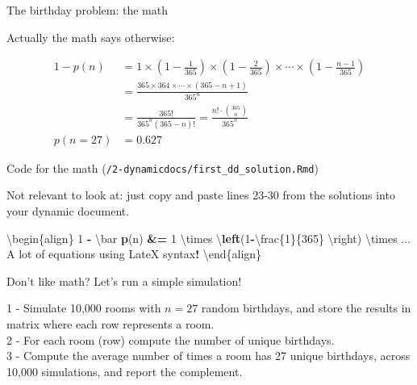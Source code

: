 \documentclass[ignorenonframetext,]{beamer}
\newenvironment{Shaded}{\begin{snugshade}}{\end{snugshade}}
\newcommand{\KeywordTok}[1]{\textcolor[rgb]{0.13,0.29,0.53}{\textbf{#1}}}
\newcommand{\DecValTok}[1]{\textcolor[rgb]{0.00,0.00,0.81}{#1}}
\newcommand{\StringTok}[1]{\textcolor[rgb]{0.31,0.60,0.02}{#1}}
\newcommand{\OperatorTok}[1]{\textcolor[rgb]{0.81,0.36,0.00}{\textbf{#1}}}
\newcommand{\ErrorTok}[1]{\textcolor[rgb]{0.64,0.00,0.00}{\textbf{#1}}}
\newcommand{\NormalTok}[1]{#1}
\begin{document}
\begin{frame}{The birthday problem: the math}

Actually the math says otherwise:

\begin{align} 
 1 -  p(n) &= 1 \times \left(1-\frac{1}{365}\right) \times \left(1-\frac{2}{365}\right) \times \cdots \times \left(1-\frac{n-1}{365}\right) \nonumber  \\  &= \frac{ 365 \times 364 \times \cdots \times (365-n+1) }{ 365^n } \nonumber \\ &= \frac{ 365! }{ 365^n (365-n)!} = \frac{n!\cdot\binom{365}{n}}{365^n}\\
p(n= 27) &= 0.627  \nonumber
\end{align}

\end{frame}

\begin{frame}[fragile]{Code for the math
(\texttt{/2-dynamicdocs/first\_dd\_solution.Rmd})}

Not relevant to look at: just copy and paste lines 23-30 from the
solutions into your dynamic document.

\begin{Shaded}
\begin{Highlighting}[]
\NormalTok{\textbackslash{}begin\{align\} }
 \DecValTok{1} \OperatorTok{-}\StringTok{ }\NormalTok{\textbackslash{}bar }\KeywordTok{p}\NormalTok{(n) }\OperatorTok{&}\ErrorTok{=}\StringTok{ }\DecValTok{1}\NormalTok{ \textbackslash{}times \textbackslash{}}\KeywordTok{left}\NormalTok{(}\DecValTok{1}\OperatorTok{-}\NormalTok{\textbackslash{}frac\{}\DecValTok{1}\NormalTok{\}\{}\DecValTok{365}\NormalTok{\}}
\NormalTok{                                 \textbackslash{}right) }
\NormalTok{ \textbackslash{}times ...}
\NormalTok{ A lot of equations using LateX syntax}\OperatorTok{!}
\NormalTok{\textbackslash{}end\{align\}}
\end{Highlighting}
\end{Shaded}

\end{frame}

\begin{frame}{Don't like math? Let's run a simple simulation!}

1 - Simulate 10,000 rooms with \(n = 27\) random birthdays, and store
the results in matrix where each row represents a room.\\
2 - For each room (row) compute the number of unique birthdays.\\
3 - Compute the average number of times a room has 27 unique birthdays,
across 10,000 simulations, and report the complement.

\end{frame}
\end{document}
